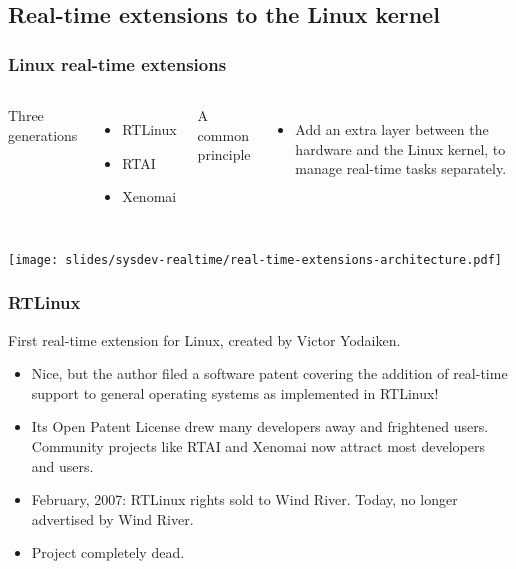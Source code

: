 \subsection{Real-time extensions to the Linux kernel}

\begin{frame}
  \frametitle{Linux real-time extensions}
  \begin{columns}
    Three generations
    \begin{itemize}
    \item RTLinux
    \item RTAI
    \item Xenomai
    \end{itemize}
    A common principle
    \begin{itemize}
    \item Add an extra layer between the hardware and the Linux kernel, to manage
      real-time tasks separately.
    \end{itemize}
  \end{columns}
  \begin{center}
    \texttt{[image: slides/sysdev-realtime/real-time-extensions-architecture.pdf]}
  \end{center}
\end{frame}

\begin{frame}
  \frametitle{RTLinux}
  First real-time extension for Linux, created by Victor Yodaiken.
  \begin{itemize}
  \item Nice, but the author filed a software patent covering the
    addition of real-time support to general operating systems as
    implemented in RTLinux!
  \item Its Open Patent License drew many developers away and
    frightened users.  Community projects like RTAI and Xenomai now
    attract most developers and users.
  \item February, 2007: RTLinux rights sold to Wind River. Today,
    no longer advertised by Wind River.
  \item Project completely dead.
  \end{itemize}
\end{frame}

